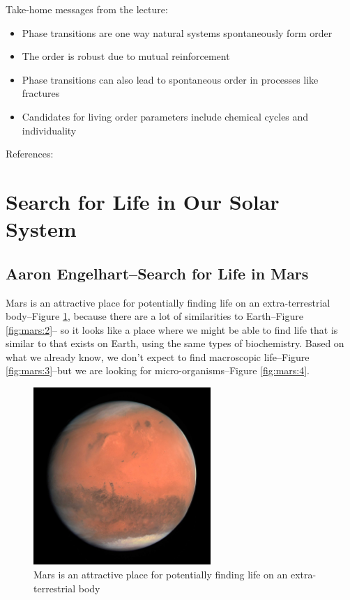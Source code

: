 \documentclass[]{article}
\begin{document}
Take-home messages from the lecture:
\begin{itemize}
	\item Phase transitions are one way natural systems  spontaneously form order
	\item The order is robust due to mutual reinforcement
	\item Phase transitions can also lead to spontaneous order in processes like fractures
	\item Candidates for living order parameters include chemical cycles and individuality
\end{itemize}

References: \cite{smith2011large,goldenfeld2018lectures,smith2015new,smith2016origin}

\section{Search for Life in Our Solar System}

\subsection[Search for Life in Mars]{Aaron Engelhart--Search for Life in Mars}

Mars is an attractive place for potentially finding life on an extra-terrestrial body--Figure \ref{fig:mars:1}, because there are a lot of similarities to Earth--Figure \ref{fig:mars:2}-- so it looks like a place where we might be able to find life that is similar to that exists on Earth, using the same types of biochemistry. Based on what we already know, we don't expect to find macroscopic life--Figure \ref{fig:mars:3}--but we  are looking for micro-organisms--Figure \ref{fig:mars:4}.
\begin{figure}[H]
	\caption{Mars is an attractive place for potentially finding life on an extra-terrestrial body}\label{fig:mars:1}
	\includegraphics[width=0.6\textwidth]{Mars1}
\end{figure}
\end{document}
